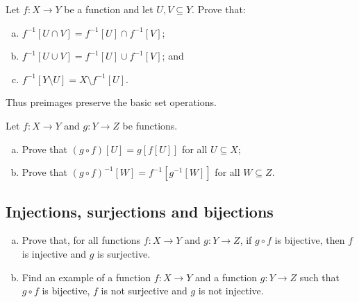 \begin{chapex}
Let $f : X \to Y$ be a function and let $U, V \subseteq Y$. Prove that:
\begin{enumerate}[(a)]
\item $f^{-1}[U \cap V] = f^{-1}[U] \cap f^{-1}[V]$;
\item $f^{-1}[U \cup V] = f^{-1}[U] \cup f^{-1}[V]$; and
\item $f^{-1}[Y \setminus U] = X \setminus f^{-1}[U]$.
\end{enumerate}
Thus preimages preserve the basic set operations.
\end{chapex}

\begin{chapex}
Let $f : X \to Y$ and $g : Y \to Z$ be functions.
\begin{enumerate}[(a)]
\item Prove that $(g \circ f)[U] = g[f[U]]$ for all $U \subseteq X$;
\item Prove that $(g \circ f)^{-1}[W] = f^{-1}[g^{-1}[W]]$ for all $W \subseteq Z$.
\end{enumerate}
\end{chapex}

\subsection*{Injections, surjections and bijections}

\begin{chapex}
\begin{enumerate}[(a)]
\item Prove that, for all functions $f : X \to Y$ and $g : Y \to Z$, if $g \circ f$ is bijective, then $f$ is injective and $g$ is surjective.
\item Find an example of a function $f : X \to Y$ and a function $g : Y \to Z$ such that $g \circ f$ is bijective, $f$ is not surjective and $g$ is not injective.
\end{enumerate}
\end{chapex}

